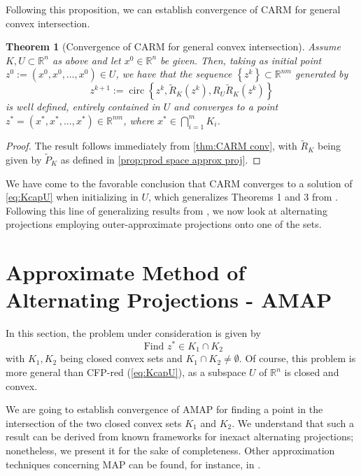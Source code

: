\documentclass[smallextended,numbook,nospthms]{svjour3}
\theoremstyle{plain}
\newtheorem{theorem}{Theorem}[subsection]
\theoremstyle{definition}
\def\RR{\mathds R}
\DeclareMathOperator{\circum}{circ}
\begin{document}
Following this proposition, we can establish convergence of CARM for general convex intersection.

\begin{theorem}[Convergence of CARM for general convex intersection]\label{thm:CARM conv general}
Assume $K, U \subset \RR^{n}$ as above and let $x^{0} \in \RR^{n}$ be given. Then, taking as initial point $z^{0}:=\left(x^{0}, x^{0}, \ldots, x^{0}\right) \in U$, we have that the sequence $\left\{z^{k}\right\} \subset \RR^{nm}$ generated by
\[
z^{k+1}:=\circum\left\{z^{k}, \tilde{R}_{K}\left(z^{k}\right), R_{U}\tilde{R}_{K}\left(z^{k}\right)\right\}
\]
is well defined, entirely contained in $U$ and converges to a point $z^{*}=\left(x^{*}, x^{*}, \ldots, x^{*}\right) \in \RR^{nm}$, where $x^{*} \in \bigcap_{i=1}^{m} K_{i}$.
\end{theorem}
\begin{proof}
The result follows immediately from \cref{thm:CARM conv}, with $\tilde{R}_{K}$ being given by $\tilde{P}_{K}$ as defined in \cref{prop:prod space approx proj}.
\end{proof}

We have come to the favorable conclusion that CARM converges to a solution of \cref{eq:KcapU} when initializing in $U$, which generalizes Theorems 1 and 3 from \cite{Behling:2020}. Following this line of generalizing results from \cite{Behling:2020}, we now look at alternating projections employing outer-approximate projections onto one of the sets. 



\newpage
\section{Approximate Method of Alternating Projections - AMAP}\label{sec:AMAP}
In this section, the problem under consideration is given by
$$
\text { Find } z^{*} \in K_1 \cap K_2
$$
with $K_1, K_2$ being closed convex sets and $K_1 \cap K_2 \not = \emptyset$. Of course, this problem is more general than CFP-red (\cref{eq:KcapU}), as a subspace $U$ of $\RR^{n}$ is closed and convex.

We are going to establish convergence of AMAP for finding a point in the intersection of the two closed convex sets $K_1$ and $K_2$. We understand that such a result can be derived from known frameworks for inexact alternating projections; nonetheless, we present it for the sake of completeness. Other approximation techniques concerning MAP can be found, for instance, in \cite{Luke:2012, Luke:2013}.
\end{document}
